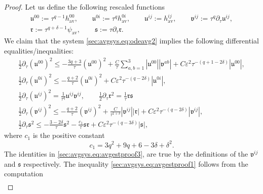 \documentclass{article}
\newcommand{\av}{\mathrm{av}}
\newcommand{\mf}{\mathfrak}
\newcommand{\ve}{\varepsilon}
\newcommand{\pa}{\partial}
\begin{document}
\begin{proof}
    Let us define the following rescaled functions
    \begin{subequations}
        \begin{gather}
            \mf{u}^{00}:= \tau^{q-1}h_{\av}^{00},\qquad \mf{u}^{0i}:= \tau^{q}h_{\av}^{0i},\qquad
            \mf{u}^{ij}:= h_{\av}^{ij},\qquad \mf{v}^{ij}:= \tau^q\pa_\tau\mf{u}^{ij},\\ \mf{r}:= \tau^{q+\delta-1}\psi_{\av},\qquad \mf{s}:=\tau\pa_\tau \mf{r}.
        \end{gather}
    \end{subequations}
    We claim that the system \eqref{sec:avgsys.eq:odeavg2} implies the following differential equalities/inequalities:
    \begin{subequations}
        \begin{gather}
            \frac{1}{2}\pa_\tau (\mf{u}^{00})^2 \leq -\frac{3q+3}{\tau}(\mf{u}^{00})^2 + \frac{C}{\tau}\sum_{a,b=1}^3|\mf{u}^{00}||\mf{v}^{ab}| + C\ve^2\tau^{-(q+1-2\delta)}|\mf{u}^{00}|,\label{sec:avgsys.eq:avgestproof1}\\
            \frac{1}{2}\pa_\tau(\mf{u}^{0i})^2 \leq-\frac{q+2}{\tau}(\mf{u}^{0i})^2 + C\ve^2\tau^{-(q-2\delta)}|\mf{u}^{0i}|,\label{sec:avgsys.eq:avgestproof2}\\
            \frac{1}{2}\pa_\tau(\mf{u}^{ij})^2 = \frac{1}{\tau^{q}}\mf{u}^{ij}\mf{v}^{ij},\qquad \frac{1}{2}\pa_\tau \mf{r}^2 =\frac{1}{\tau}\mf{r}\mf{s}\label{sec:avgsys.eq:avgestproof3}\\
            \frac{1}{2}\pa_\tau (\mf{v}^{ij})^2 \leq - \frac{q+2}{\tau}(\mf{v}^{ij})^2 + \frac{C}{\tau^{1+\delta}}|\mf{v}^{ij}||\mf{r}| + C\ve^2 \tau^{-(q-2\delta)}|\mf{v}^{ij}|,\label{sec:avgsys.eq:avgestproof4}\\
            \frac{1}{2}\pa_\tau \mf{s}^2 \leq -\frac{3-2\delta}{\tau}\mf{s}^2 - \frac{c_1}{\tau}\mf{s}\mf{r} + C\ve^2\tau^{-(q-3\delta)}|\mf{s}|,\label{sec:avgsys.eq:avgestproof5}
        \end{gather}
    \end{subequations}
    where $c_1$ is the positive constant
    \begin{equation}
        c_1 = 3q^2+9q+6-3\delta+\delta^2.
    \end{equation}
    The identities in \eqref{sec:avgsys.eq:avgestproof3}, are true by the definitions of the $\mf{v}^{ij}$ and $\mf{s}$ respectively. The inequality \eqref{sec:avgsys.eq:avgestproof1} follows from the computation
    \begin{align}

\end{align}
\end{proof}
\end{document}
